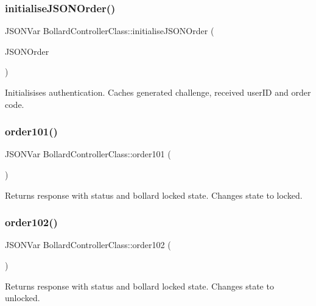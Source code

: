 \subsubsection{\texorpdfstring{initialise\+J\+S\+O\+N\+Order()}{initialiseJSONOrder()}}
{\footnotesize\ttfamily J\+S\+O\+N\+Var Bollard\+Controller\+Class\+::initialise\+J\+S\+O\+N\+Order (\begin{DoxyParamCaption}\item[{J\+S\+O\+N\+Var}]{J\+S\+O\+N\+Order }\end{DoxyParamCaption})\hspace{0.3cm}{\ttfamily [private]}}

Initialisises authentication. Caches generated challenge, received user\+ID and order code. \mbox{\label{class_bollard_controller_class_ac4862bcb5d565875e5330865c9a2af7f}} 
\subsubsection{\texorpdfstring{order101()}{order101()}}
{\footnotesize\ttfamily J\+S\+O\+N\+Var Bollard\+Controller\+Class\+::order101 (\begin{DoxyParamCaption}{ }\end{DoxyParamCaption})\hspace{0.3cm}{\ttfamily [private]}}

Returns response with status and bollard locked state. Changes state to locked. \mbox{\label{class_bollard_controller_class_ad411677305ddacf05e5d26470dfa1253}} 
\subsubsection{\texorpdfstring{order102()}{order102()}}
{\footnotesize\ttfamily J\+S\+O\+N\+Var Bollard\+Controller\+Class\+::order102 (\begin{DoxyParamCaption}{ }\end{DoxyParamCaption})\hspace{0.3cm}{\ttfamily [private]}}

Returns response with status and bollard locked state. Changes state to unlocked. \mbox{\label{class_bollard_controller_class_a2d88e7925b96e33a9feb1d694af472ff}} 

